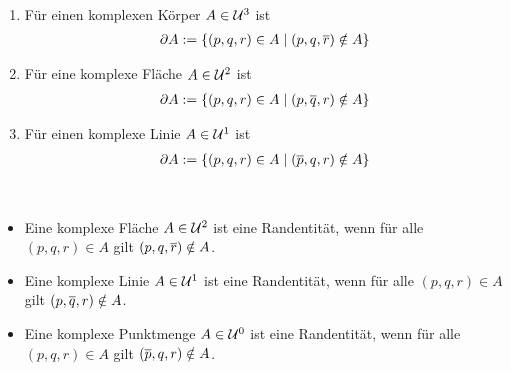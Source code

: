 \begin{dfn}\ 
    \begin{enumerate}
        \item Für einen komplexen Körper $A \in \mathcal{U}^3$ ist
            \begin{align*}
                \partial A := \{(p,q,r) \in A \mid (p,q,\overline{r}) \notin A\}
            \end{align*}
        \item Für eine komplexe Fläche $A \in \mathcal{U}^2$ ist
            \begin{align*}
                \partial A := \{(p,q,r) \in A \mid (p,\overline{q},r) \notin A\}
            \end{align*}
        \item Für einen komplexe Linie $A \in \mathcal{U}^1$ ist
            \begin{align*}
                \partial A := \{(p,q,r) \in A \mid (\overline{p},q,r) \notin A\}
            \end{align*}
    \end{enumerate}
\end{dfn}

\begin{dfn}[Randentität]\ 
    \begin{itemize}
        \item Eine komplexe Fläche $A \in \mathcal{U}^2$ ist eine Randentität, wenn für alle $(p,q,r) \in A$ gilt $(p,q,\overline{r}) \notin A$.
        \item Eine komplexe Linie $A \in \mathcal{U}^1$ ist eine Randentität, wenn für alle $(p,q,r) \in A$ gilt $(p,\overline{q},r) \notin A$.
        \item Eine komplexe Punktmenge $A \in \mathcal{U}^0$ ist eine Randentität, wenn für alle $(p,q,r) \in A$ gilt $(\overline{p},q,r) \notin A$.
    \end{itemize}
\end{dfn}







